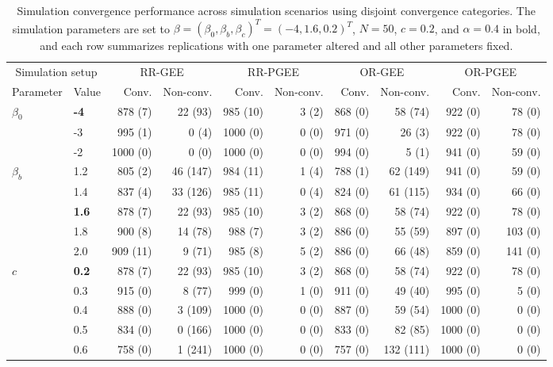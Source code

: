 \begin{table}[htbp]
\centering
\scriptsize
\setlength{\tabcolsep}{3pt}
\renewcommand{\arraystretch}{1.15}
\caption{Simulation convergence performance across simulation scenarios using disjoint convergence categories. The simulation parameters are set to $\beta = (\beta_0, \beta_b, \beta_c)^T = (-4, 1.6, 0.2)^T$, $N = 50$, $c = 0.2$, and $\alpha = 0.4$ in bold, and each row summarizes replications with one parameter altered and all other parameters fixed.}
\begin{tabular}{ll|rr|rr|rr|rr}
\hline
\multicolumn{2}{c|}{Simulation setup} & \multicolumn{2}{c|}{RR-GEE} & \multicolumn{2}{c|}{RR-PGEE} & \multicolumn{2}{c|}{OR-GEE} & \multicolumn{2}{c}{OR-PGEE} \\
Parameter & Value & Conv. & Non-conv. & Conv. & Non-conv. & Conv. & Non-conv. & Conv. & Non-conv. \\
\hline
$\beta_0$ & \textbf{-4} & 878 (7) & 22 (93) & 985 (10) & 3 (2) & 868 (0) & 58 (74) & 922 (0) & 78 (0) \\
 & -3 & 995 (1) & 0 (4) & 1000 (0) & 0 (0) & 971 (0) & 26 (3) & 922 (0) & 78 (0) \\
 & -2 & 1000 (0) & 0 (0) & 1000 (0) & 0 (0) & 994 (0) & 5 (1) & 941 (0) & 59 (0) \\
\hline
$\beta_b$ & 1.2 & 805 (2) & 46 (147) & 984 (11) & 1 (4) & 788 (1) & 62 (149) & 941 (0) & 59 (0) \\
 & 1.4 & 837 (4) & 33 (126) & 985 (11) & 0 (4) & 824 (0) & 61 (115) & 934 (0) & 66 (0) \\
 & \textbf{1.6} & 878 (7) & 22 (93) & 985 (10) & 3 (2) & 868 (0) & 58 (74) & 922 (0) & 78 (0) \\
 & 1.8 & 900 (8) & 14 (78) & 988 (7) & 3 (2) & 886 (0) & 55 (59) & 897 (0) & 103 (0) \\
 & 2.0 & 909 (11) & 9 (71) & 985 (8) & 5 (2) & 886 (0) & 66 (48) & 859 (0) & 141 (0) \\
\hline
$c$ & \textbf{0.2} & 878 (7) & 22 (93) & 985 (10) & 3 (2) & 868 (0) & 58 (74) & 922 (0) & 78 (0) \\
 & 0.3 & 915 (0) & 8 (77) & 999 (0) & 1 (0) & 911 (0) & 49 (40) & 995 (0) & 5 (0) \\
 & 0.4 & 888 (0) & 3 (109) & 1000 (0) & 0 (0) & 887 (0) & 59 (54) & 1000 (0) & 0 (0) \\
 & 0.5 & 834 (0) & 0 (166) & 1000 (0) & 0 (0) & 833 (0) & 82 (85) & 1000 (0) & 0 (0) \\
 & 0.6 & 758 (0) & 1 (241) & 1000 (0) & 0 (0) & 757 (0) & 132 (111) & 1000 (0) & 0 (0) \\

\end{tabular}
\end{table}
